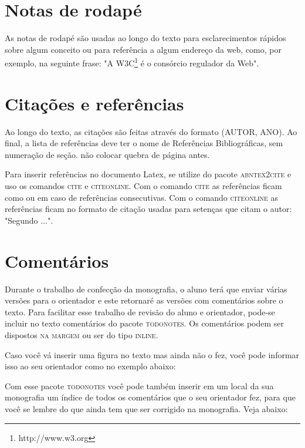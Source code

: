 \documentclass{article}
\begin{document}
\section{Notas de rodap\'e}
As notas de rodap\'e s\~ao usadas ao longo do texto para esclarecimentos r\'apidos sobre algum conceito ou para refer\^encia a algum endere\c{c}o da web, como, por exemplo, na seguinte frase: "A W3C\footnote{http://www.w3.org} \'e o cons\'orcio regulador da Web".



\section{Cita\c{c}\~oes e refer\^encias}
Ao longo do texto, as cita\c{c}\~oes s\~ao feitas atrav\'es do formato (AUTOR, ANO). Ao final, a lista de refer\^encias deve ter o nome de Refer\^encias Bibliogr\'aficas, sem numera\c{c}\~ao de se\c{c}\~ao. n\~ao colocar quebra de p\'agina antes. 

Para inserir refer\^encias no documento Latex, se utilize do pacote \textsc{abntex2cite} e uso os comandos \textsc{cite} e \textsc{citeonline}. Com o comando \textsc{cite} as refer\^encias ficam como \cite{stojanovic2002} ou \cite{souza2010book, souza2008ismicka} em caso de refer\^encias consecutivas. Com o comando \textsc{citeonline} as refer\^encias ficam no formato de cita\c{c}\~ao usadas para seten\c{c}as que citam o autor: "Segundo ...".


\section{Coment\'arios}
Durante o trabalho de confec\c{c}\~ao da monografia, o aluno ter\'a que enviar v\'arias vers\~oes para o orientador e este retornar\'e as vers\~oes com coment\'arios sobre o texto. Para facilitar esse trabalho de revis\~ao do aluno e orientador, pode-se incluir no texto coment\'arios do pacote \textsc{todonotes}. Os coment\'arios podem ser dispostos \textsc{na margem}  ou ser do tipo \textsc{inline}.

Caso voc\^e v\'a inserir uma figura no texto mas ainda n\~ao o fez, voc\^e pode informar isso ao seu orientador como no exemplo abaixo:

Com esse pacote \textsc{todonotes} voc\^e pode tamb\'em inserir em um local da sua monografia um \'indice de todos os coment\'arios que o seu orientador fez, para que voc\^e se lembre do que ainda tem que ser corrigido na monografia. Veja abaixo:
\end{document}
